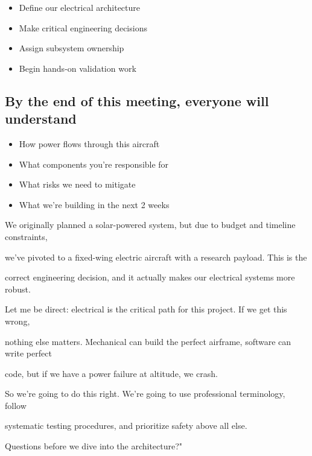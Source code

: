 \documentclass[11pt,letterpaper]{article}
\begin{document}
{\begin{itemize}
  \item Define our electrical architecture
  \item Make critical engineering decisions
  \item Assign subsystem ownership
  \item Begin hands-on validation work
\end{itemize}

\subsection{By the end of this meeting, everyone will understand}

\begin{itemize}
  \item How power flows through this aircraft
  \item What components you're responsible for
  \item What risks we need to mitigate
  \item What we're building in the next 2 weeks
\end{itemize}

We originally planned a solar-powered system, but due to budget and timeline constraints,\par

we've pivoted to a fixed-wing electric aircraft with a research payload. This is the\par

correct engineering decision, and it actually makes our electrical systems more robust.\par

Let me be direct: electrical is the critical path for this project. If we get this wrong,\par

nothing else matters. Mechanical can build the perfect airframe, software can write perfect\par

code, but if we have a power failure at altitude, we crash.\par

So we're going to do this right. We're going to use professional terminology, follow\par

systematic testing procedures, and prioritize safety above all else.\par

Questions before we dive into the architecture?"\par

}
\end{document}
